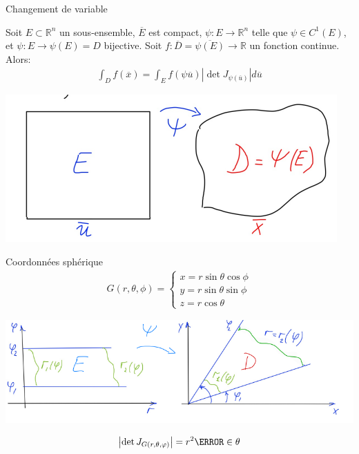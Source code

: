 \begin{parag}{Changement de variable}
    
    \begin{theoreme}
    Soit $E \subset \mathbb{R}^{n} $ un sous-ensemble, $\overline{E}$ est compact, $\psi: E \to \mathbb{R}^{n}$ telle que $\psi \in C^1\left(E\right)$, et $\psi: E \to \psi\left(E\right) = D$ bijective. Soit $f : \overline{D}  = \overline{\psi\left(E\right)} \to \mathbb{R}$ un fonction continue. Alors:
    \begin{align*} \int_D f\left(\overline{x}\right) =  \int_E f\left(\psi\overline{u}\right)\left|\det J_{\psi\left(\overline{u}\right)}\right|d\overline{u} \end{align*}
    \end{theoreme}
        \begin{center}
            \includegraphics[scale=0.8]{32025-05-26.png}
        \end{center}
\end{parag}
\begin{parag}{Coordonnées sphérique}
    \begin{align*} 
        G\left(r, \theta, \phi\right) =  
        \begin{cases}
            x =  r \sin \theta \cos \phi\\
            y = r \sin \theta \sin \phi\\
            z =  r \cos \theta
        \end{cases}
    \end{align*}
    \begin{center}
        \includegraphics[scale=0.6]{42025-05-26.png}
    \end{center}
    \begin{align*} \left|\det J_{G\left(r, \theta, \phi\right)}\right| = r^2\s\in\theta \end{align*}
\end{parag}
